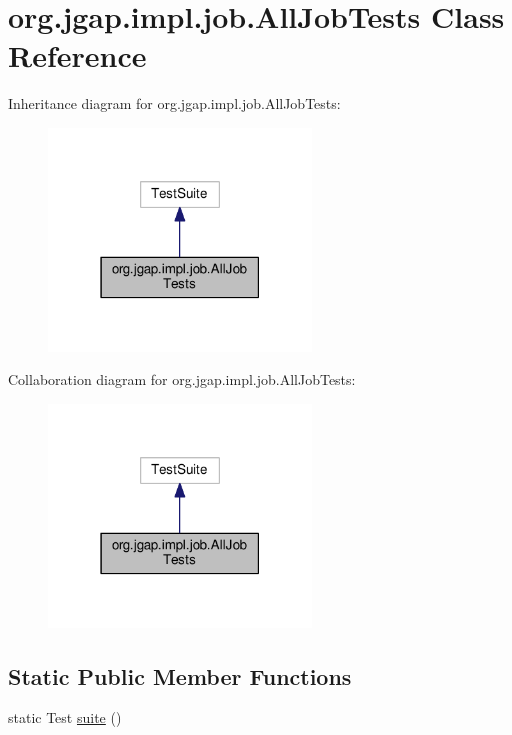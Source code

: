 \hypertarget{classorg_1_1jgap_1_1impl_1_1job_1_1_all_job_tests}{\section{org.\-jgap.\-impl.\-job.\-All\-Job\-Tests Class Reference}
\label{classorg_1_1jgap_1_1impl_1_1job_1_1_all_job_tests}
}


Inheritance diagram for org.\-jgap.\-impl.\-job.\-All\-Job\-Tests\-:
\nopagebreak
\begin{figure}[H]
\begin{center}
\leavevmode
\includegraphics[width=198pt]{classorg_1_1jgap_1_1impl_1_1job_1_1_all_job_tests__inherit__graph}
\end{center}
\end{figure}


Collaboration diagram for org.\-jgap.\-impl.\-job.\-All\-Job\-Tests\-:
\nopagebreak
\begin{figure}[H]
\begin{center}
\leavevmode
\includegraphics[width=198pt]{classorg_1_1jgap_1_1impl_1_1job_1_1_all_job_tests__coll__graph}
\end{center}
\end{figure}
\subsection*{Static Public Member Functions}
\begin{DoxyCompactItemize}
\item 
static Test \hyperlink{classorg_1_1jgap_1_1impl_1_1job_1_1_all_job_tests_ab9acdb8f11d57f862d42dc526382d8a8}{suite} ()
\end{DoxyCompactItemize}
